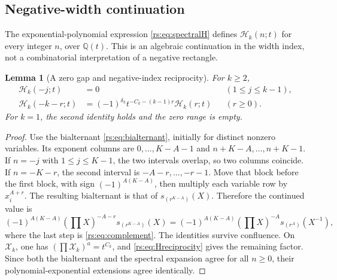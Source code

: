 \documentclass[11pt]{article}
\newtheorem{lemma}[theorem]{Lemma}
\theoremstyle{definition}
\theoremstyle{remark}
\newcommand{\Q}{\mathbb Q}
\newcommand{\Ht}{\mathcal H}
\newcommand{\XX}{\mathcal X}
\theoremstyle{definition}
\theoremstyle{plain}
\numberwithin{equation}{section}
\begin{document}
\subsection{Negative-width continuation}
The exponential-polynomial expression \eqref{rs:eq:spectralH} defines
$\Ht_k(n;t)$ for every integer $n$, over $\Q(t)$. This is an algebraic
continuation in the width index, not a combinatorial interpretation of a
negative rectangle.

\begin{lemma}[A zero gap and negative-index reciprocity]
\label{rs:lem:negative}
For $k\ge2$,
\begin{align}
 \Ht_k(-j;t)&=0&& (1\le j\le k-1),\label{rs:eq:negativezero}\\
 \Ht_k(-k-r;t)&=(-1)^{\delta_k}t^{-C_k-(k-1)r}\Ht_k(r;t)
 &&(r\ge0).
 \label{rs:eq:negativeH}
\end{align}
For $k=1$, the second identity holds and the zero range is empty.
\end{lemma}
\begin{proof}
Use the bialternant \eqref{rs:eq:bialternant}, initially for distinct nonzero
variables. Its exponent columns are $0,\ldots,K-A-1$ and
$n+K-A,\ldots,n+K-1$. If $n=-j$ with $1\le j\le K-1$, the two intervals
overlap, so two columns coincide. If $n=-K-r$, the second interval is
$-A-r,\ldots,-r-1$. Move that block before the first block, with sign
$(-1)^{A(K-A)}$, then multiply each variable row by $x_i^{A+r}$.
The resulting bialternant is that of $s_{(r^{K-A})}(X)$. Therefore the
continued value is
\[
 (-1)^{A(K-A)}(\prod X)^{-A-r}s_{(r^{K-A})}(X)
 =(-1)^{A(K-A)}(\prod X)^{-A}s_{(r^A)}(X^{-1}),
\]
where the last step is \eqref{rs:eq:complement}. The identities survive
confluence. On $\XX_k$, one has
$(\prod\XX_k)^a=t^{C_k}$, and \eqref{rs:eq:Hreciprocity} gives the remaining
factor. Since both the bialternant and the spectral expansion agree for all
$n\ge0$, their polynomial-exponential extensions agree identically.
\end{proof}
\end{document}

